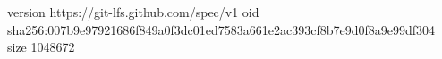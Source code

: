 version https://git-lfs.github.com/spec/v1
oid sha256:007b9e97921686f849a0f3dc01ed7583a661e2ac393cf8b7e9d0f8a9e99df304
size 1048672
